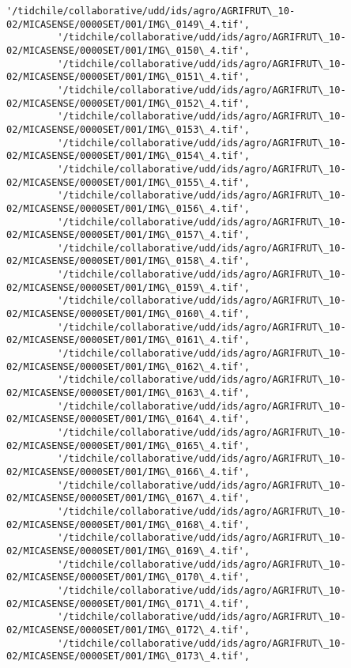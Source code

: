 \documentclass[11pt]{article}
\begin{document}
\begin{Verbatim}[commandchars=\\\{\}]
         '/tidchile/collaborative/udd/ids/agro/AGRIFRUT\_10-02/MICASENSE/0000SET/001/IMG\_0149\_4.tif',
         '/tidchile/collaborative/udd/ids/agro/AGRIFRUT\_10-02/MICASENSE/0000SET/001/IMG\_0150\_4.tif',
         '/tidchile/collaborative/udd/ids/agro/AGRIFRUT\_10-02/MICASENSE/0000SET/001/IMG\_0151\_4.tif',
         '/tidchile/collaborative/udd/ids/agro/AGRIFRUT\_10-02/MICASENSE/0000SET/001/IMG\_0152\_4.tif',
         '/tidchile/collaborative/udd/ids/agro/AGRIFRUT\_10-02/MICASENSE/0000SET/001/IMG\_0153\_4.tif',
         '/tidchile/collaborative/udd/ids/agro/AGRIFRUT\_10-02/MICASENSE/0000SET/001/IMG\_0154\_4.tif',
         '/tidchile/collaborative/udd/ids/agro/AGRIFRUT\_10-02/MICASENSE/0000SET/001/IMG\_0155\_4.tif',
         '/tidchile/collaborative/udd/ids/agro/AGRIFRUT\_10-02/MICASENSE/0000SET/001/IMG\_0156\_4.tif',
         '/tidchile/collaborative/udd/ids/agro/AGRIFRUT\_10-02/MICASENSE/0000SET/001/IMG\_0157\_4.tif',
         '/tidchile/collaborative/udd/ids/agro/AGRIFRUT\_10-02/MICASENSE/0000SET/001/IMG\_0158\_4.tif',
         '/tidchile/collaborative/udd/ids/agro/AGRIFRUT\_10-02/MICASENSE/0000SET/001/IMG\_0159\_4.tif',
         '/tidchile/collaborative/udd/ids/agro/AGRIFRUT\_10-02/MICASENSE/0000SET/001/IMG\_0160\_4.tif',
         '/tidchile/collaborative/udd/ids/agro/AGRIFRUT\_10-02/MICASENSE/0000SET/001/IMG\_0161\_4.tif',
         '/tidchile/collaborative/udd/ids/agro/AGRIFRUT\_10-02/MICASENSE/0000SET/001/IMG\_0162\_4.tif',
         '/tidchile/collaborative/udd/ids/agro/AGRIFRUT\_10-02/MICASENSE/0000SET/001/IMG\_0163\_4.tif',
         '/tidchile/collaborative/udd/ids/agro/AGRIFRUT\_10-02/MICASENSE/0000SET/001/IMG\_0164\_4.tif',
         '/tidchile/collaborative/udd/ids/agro/AGRIFRUT\_10-02/MICASENSE/0000SET/001/IMG\_0165\_4.tif',
         '/tidchile/collaborative/udd/ids/agro/AGRIFRUT\_10-02/MICASENSE/0000SET/001/IMG\_0166\_4.tif',
         '/tidchile/collaborative/udd/ids/agro/AGRIFRUT\_10-02/MICASENSE/0000SET/001/IMG\_0167\_4.tif',
         '/tidchile/collaborative/udd/ids/agro/AGRIFRUT\_10-02/MICASENSE/0000SET/001/IMG\_0168\_4.tif',
         '/tidchile/collaborative/udd/ids/agro/AGRIFRUT\_10-02/MICASENSE/0000SET/001/IMG\_0169\_4.tif',
         '/tidchile/collaborative/udd/ids/agro/AGRIFRUT\_10-02/MICASENSE/0000SET/001/IMG\_0170\_4.tif',
         '/tidchile/collaborative/udd/ids/agro/AGRIFRUT\_10-02/MICASENSE/0000SET/001/IMG\_0171\_4.tif',
         '/tidchile/collaborative/udd/ids/agro/AGRIFRUT\_10-02/MICASENSE/0000SET/001/IMG\_0172\_4.tif',
         '/tidchile/collaborative/udd/ids/agro/AGRIFRUT\_10-02/MICASENSE/0000SET/001/IMG\_0173\_4.tif',

\end{Verbatim}
\end{document}
